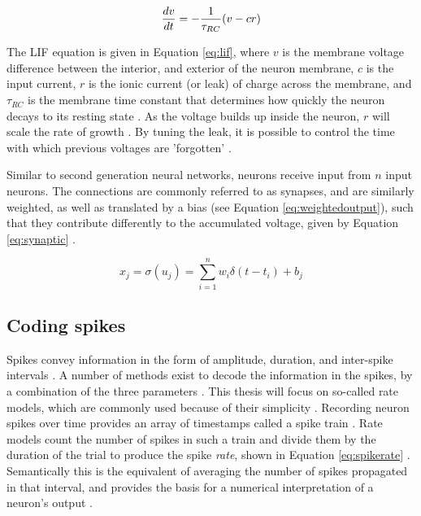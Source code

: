 \documentclass[report.tex]{subfiles}
\begin{document}
\begin{equation}
  \frac{dv}{dt} = - {1 \over \tau_{RC}} (v - cr)
  \label{eq:lif}
\end{equation}

The LIF equation is given in Equation \ref{eq:lif}, where
$v$ is the membrane voltage difference between the interior,
and exterior of the neuron membrane, $c$ is the input current, $r$
is the ionic current (or leak) of charge across the membrane, and
$\tau_{RC}$ is the membrane time constant that determines how
quickly the neuron decays to its resting state \cite{Dayan2001, Eliasmith2004}.
As the voltage builds up inside the neuron, $r$ will scale the
rate of growth \cite{Eliasmith2004}.
By tuning the leak, it is possible to control the time with which
previous voltages are 'forgotten' \cite{Eliasmith2004}.

Similar to second generation neural networks, neurons
receive input from $n$ input neurons.
The connections are commonly referred to as synapses, and are similarly
weighted, as well as translated by a bias (see Equation \ref{eq:weightedoutput}),
such that they contribute differently to the accumulated 
voltage, given by Equation \ref{eq:synaptic} \cite{Dayan2001}.

\begin{equation}
  x_j = \sigma(u_j) = \sum_{i=1}^n{w_i\delta(t - t_i)} + b_j
  \label{eq:synaptic}
\end{equation}

\subsection{Coding spikes} \label{sec:coding}
Spikes convey information in the form of amplitude, duration, and
inter-spike intervals \cite{Dayan2001}.
A number of methods exist to decode the information in the spikes, by a 
combination of the three parameters \cite{Dayan2001, Eliasmith2015, Diehl2015, Rueckauer2017}.
This thesis will focus on so-called rate
models, which are commonly used because of their simplicity
\cite{Eliasmith2004}.
Recording neuron spikes over time provides an array of timestamps called a
spike train \cite{Eliasmith2015}.
Rate models count the number of spikes in such a train and divide them by the duration of
the trial to produce the spike \textit{rate}, shown
in Equation \ref{eq:spikerate} \cite{Dayan2001, Eliasmith2004}.
Semantically this is the equivalent of averaging the number of spikes propagated
in that interval, and provides the basis for a numerical interpretation of a
neuron's output \cite{Eliasmith2004}.
\end{document}

